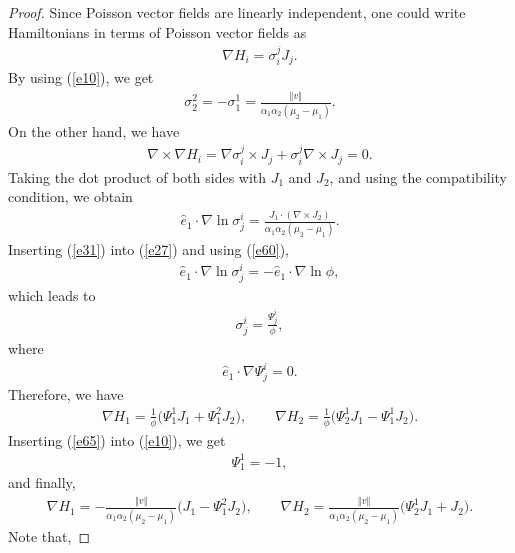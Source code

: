 \documentclass[pdftex]{sigma}
\numberwithin{equation}{section}
\begin{document}
\begin{proof}
Since Poisson vector f\/ields are linearly independent, one could write Hamiltonians in terms of Poisson vector f\/ields as
\begin{gather*}
\nabla H_{i}=\sigma _{i}^{j}J_{j}.
\end{gather*}
By using (\ref{e10}), we get
\begin{gather*}
\sigma _{2}^{2}=-\sigma _{1}^{1}=\frac{\Vert v\Vert }{\alpha_{1}\alpha _{2}(\mu _{2}-\mu _{1}) }.
\end{gather*}
On the other hand, we have
\begin{gather*}
\nabla \times \nabla H_{i}=\nabla \sigma _{i}^{j}\times J_{j}+ \sigma_{i}^{j}\nabla\times J_{j}=0.
\end{gather*}
Taking the dot product of both sides with $J_{1}$ and $J_{2}$, and using the compatibility condition, we obtain
\begin{gather}
\widehat{e}_{1}\cdot \nabla \ln \sigma _{j}^{i}=\frac{J_{1}\cdot (\nabla \times J_{2} ) }{\alpha _{1}\alpha _{2}( \mu_{2}-\mu_{1}) }. \label{e60}
\end{gather}
Inserting (\ref{e31}) into (\ref{e27}) and using (\ref{e60}),
\begin{gather*}
\widehat{e}_{1}\cdot \nabla \ln \sigma _{j}^{i}=-\widehat{e}_{1}\cdot \nabla \ln \phi,
\end{gather*}
which leads to
\begin{gather*}
\sigma _{j}^{i}=\frac{\Psi _{j}^{i}}{\phi },
\end{gather*}
where
\begin{gather*}
\widehat{e}_{1}\cdot \nabla \Psi _{j}^{i}=0.
\end{gather*}
Therefore, we have
\begin{gather}
\nabla H_{1} = \frac{1}{\phi }\big( \Psi _{1}^{1}J_{1}+\Psi_{1}^{2}J_{2}\big),\qquad \nabla H_{2} = \frac{1}{\phi }\big( \Psi_{2}^{1}J_{1}-\Psi_{1}^{1}J_{2}\big).\label{e65}
\end{gather}
Inserting (\ref{e65}) into (\ref{e10}), we get
\begin{gather*}
\Psi _{1}^{1}=-1,
\end{gather*}
and f\/inally,
\begin{gather*}
\nabla H_{1} = -\frac{\Vert v\Vert }{\alpha_{1}\alpha_{2}(\mu _{2}-\mu _{1}) }\big( J_{1}-\Psi_{1}^{2}J_{2}\big),\qquad
\nabla H_{2} = \frac{\Vert v\Vert }{\alpha_{1}\alpha_{2}(\mu _{2}-\mu _{1}) }\big( \Psi_{2}^{1}J_{1}+J_{2}\big).%
\end{gather*}
Note that,

\end{proof}
\end{document}
